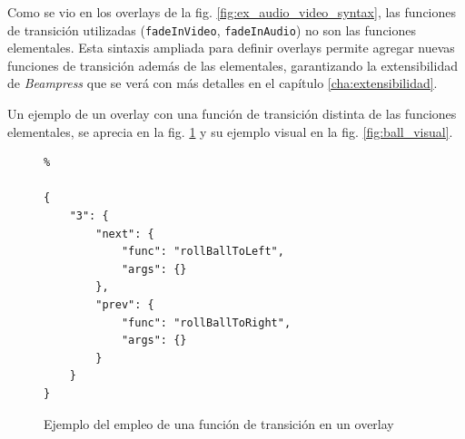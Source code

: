 		
		Como se vio en los overlays de la fig. \ref{fig:ex_audio_video_syntax}, las funciones de transición utilizadas (\texttt{fadeInVideo}, \texttt{fadeInAudio}) no son las funciones elementales. Esta sintaxis ampliada para definir overlays permite agregar nuevas funciones de transición además de las elementales, garantizando la extensibilidad de \textit{Beampress} que se verá con más detalles en el capítulo \ref{cha:extensibilidad}.


		Un ejemplo de un overlay con una función de transición distinta de las funciones elementales, se aprecia en la fig. \ref{fig:ball_code} y su ejemplo visual en la fig. \ref{fig:ball_visual}.



		\begin{figure}[htb]%
			\begin{lstlisting}%

{
    "3": {
        "next": {
            "func": "rollBallToLeft",
            "args": {}
        },
        "prev": {
            "func": "rollBallToRight",
            "args": {}
        }
    }
}
			\end{lstlisting}
		\caption{Ejemplo del empleo de una función de transición en un overlay} 
			\label{fig:ball_code} 
		\end{figure}	




